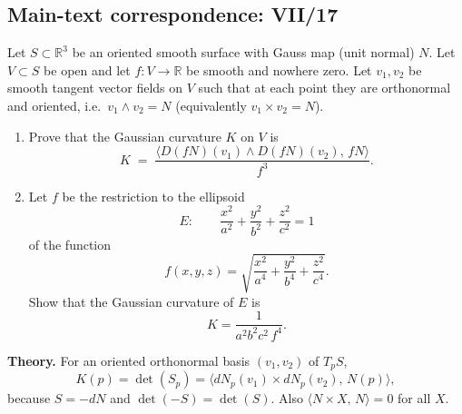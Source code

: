 \subsection*{Main-text correspondence: VII/17}

\begin{problem}
\label{prob:cp-vii-0048}
Let $S\subset\mathbb R^3$ be an oriented smooth surface with Gauss map (unit normal) $N$.
	Let $V\subset S$ be open and let $f:V\to\mathbb R$ be smooth and nowhere zero.
	Let $v_1,v_2$ be smooth tangent vector fields on $V$ such that at each point they are orthonormal and oriented,
	i.e.\ $v_1\wedge v_2=N$ (equivalently $v_1\times v_2=N$).
	
	\begin{enumerate}
		\item Prove that the Gaussian curvature $K$ on $V$ is
		\[
		K \;=\; \frac{\big\langle D(fN)(v_1)\wedge D(fN)(v_2),\, fN\big\rangle}{f^3}.
		\]
		\item Let $f$ be the restriction to the ellipsoid
		\[
		E:\qquad \frac{x^2}{a^2}+\frac{y^2}{b^2}+\frac{z^2}{c^2}=1
		\]
		of the function
		\[
		f(x,y,z)=\sqrt{\frac{x^2}{a^4}+\frac{y^2}{b^4}+\frac{z^2}{c^4}}.
		\]
		Show that the Gaussian curvature of $E$ is
		\[
		K=\frac{1}{a^2b^2c^2\, f^4}.
		\]
	\end{enumerate}
	
	\medskip
	\textbf{Theory.}
	For an oriented orthonormal basis $(v_1,v_2)$ of $T_pS$,
	\[
	K(p)=\det(S_p)=\big\langle dN_p(v_1)\times dN_p(v_2),\,N(p)\big\rangle,
	\]
	because $S=-dN$ and $\det(-S)=\det(S)$. Also $\langle N\times X,\,N\rangle=0$ for all $X$.
	
	\medskip
\end{problem}

